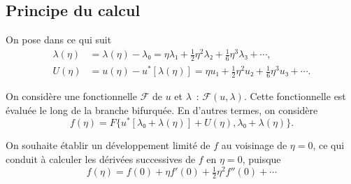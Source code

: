 \documentclass[12pt, final]{amsart}
\theoremstyle{definition}
\begin{document}
\subsection{Principe du calcul}
\label{sec:20220107121442}

On pose dans ce qui suit
\begin{align}
  \label{eq:20211112155446}
  λ(η) & = λ(η) - λ₀ = η λ₁ + \tfrac{1}{2} η^2 λ₂ + \tfrac{1}{6} η^3 λ₃ + \cdots,\\
 \label{eq:20211112113028}
  U(η) & = u(η) - u^{\ast}[λ(η)] = η u₁ + \tfrac{1}{2} η^2 u₂ + \tfrac{1}{6} η^3 u₃ + \cdots.
\end{align}

On considère une fonctionnelle \(\mathcal{F}\) de \(u\) et \(λ\)~:
\(\mathcal{F}(u, λ)\). Cette fonctionnelle est évaluée le long de la branche
bifurquée. En d'autres termes, on considère
\begin{equation}
  f(η) = F\{ u^{\ast} [λ₀ + λ(η)] + U(η), λ₀ + λ(η) \}.
\end{equation}

On souhaite établir un développement limité de \(f\) au voisinage de \(η = 0\),
ce qui conduit à calculer les dérivées successives de \(f\) en \(η = 0\),
puisque
\begin{equation}
  f(η) = f(0) + η f'(0) + \tfrac{1}{2} η^2 f''(0) + \cdots
\end{equation}
\end{document}
